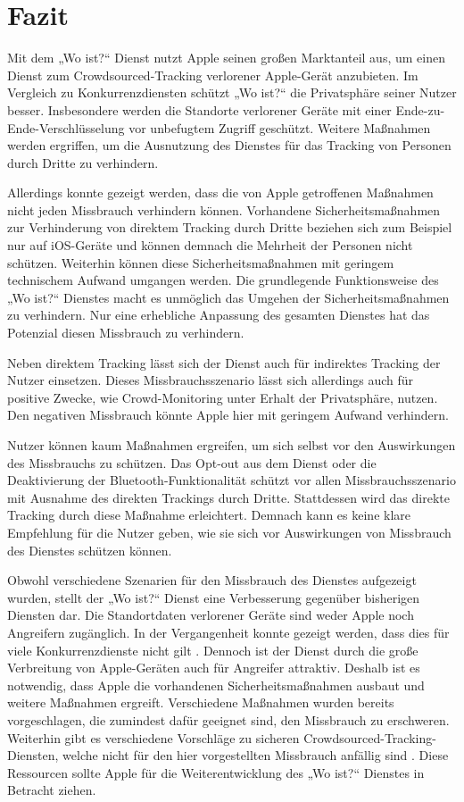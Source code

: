 \section{Fazit}
\label{sec:Fazit}

Mit dem „Wo ist?“ Dienst nutzt Apple seinen großen Marktanteil aus, um einen Dienst zum Crowdsourced-Tracking verlorener Apple-Gerät anzubieten.
Im Vergleich zu Konkurrenzdiensten schützt „Wo ist?“ die Privatsphäre seiner Nutzer besser.
Insbesondere werden die Standorte verlorener Geräte mit einer Ende-zu-Ende-Verschlüsselung vor unbefugtem Zugriff geschützt.
Weitere Maßnahmen werden ergriffen, um die Ausnutzung des Dienstes für das Tracking von Personen durch Dritte zu verhindern.

Allerdings konnte gezeigt werden, dass die von Apple getroffenen Maßnahmen nicht jeden Missbrauch verhindern können.
Vorhandene Sicherheitsmaßnahmen zur Verhinderung von direktem Tracking durch Dritte beziehen sich zum Beispiel nur auf iOS-Geräte und können demnach die Mehrheit der Personen nicht schützen.
Weiterhin können diese Sicherheitsmaßnahmen mit geringem technischem Aufwand umgangen werden.
Die grundlegende Funktionsweise des „Wo ist?“ Dienstes macht es unmöglich das Umgehen der Sicherheitsmaßnahmen zu verhindern.
Nur eine erhebliche Anpassung des gesamten Dienstes hat das Potenzial diesen Missbrauch zu verhindern.

Neben direktem Tracking lässt sich der Dienst auch für indirektes Tracking der Nutzer einsetzen.
Dieses Missbrauchsszenario lässt sich allerdings auch für positive Zwecke, wie Crowd-Monitoring unter Erhalt der Privatsphäre, nutzen.
Den negativen Missbrauch könnte Apple hier mit geringem Aufwand verhindern.

Nutzer können kaum Maßnahmen ergreifen, um sich selbst vor den Auswirkungen des Missbrauchs zu schützen.
Das Opt-out aus dem Dienst oder die Deaktivierung der Bluetooth-Funktionalität schützt vor allen Missbrauchsszenario mit Ausnahme des direkten Trackings durch Dritte.
Stattdessen wird das direkte Tracking durch diese Maßnahme erleichtert.
Demnach kann es keine klare Empfehlung für die Nutzer geben, wie sie sich vor Auswirkungen von Missbrauch des Dienstes schützen können.


Obwohl verschiedene Szenarien für den Missbrauch des Dienstes aufgezeigt wurden, stellt der „Wo ist?“ Dienst eine Verbesserung gegenüber bisherigen Diensten dar.
Die Standortdaten verlorener Geräte sind weder Apple noch Angreifern zugänglich.
In der Vergangenheit konnte gezeigt werden, dass dies für viele Konkurrenzdienste nicht gilt \cite{Garg_Secure_Tracker,Weller_BLE_Finders}.
Dennoch ist der Dienst durch die große Verbreitung von Apple-Geräten auch für Angreifer attraktiv.
Deshalb ist es notwendig, dass Apple die vorhandenen Sicherheitsmaßnahmen ausbaut und weitere Maßnahmen ergreift.
Verschiedene Maßnahmen wurden bereits vorgeschlagen, die zumindest dafür geeignet sind, den Missbrauch zu erschweren.
Weiterhin gibt es verschiedene Vorschläge zu sicheren Crowdsourced-Tracking-Diensten, welche nicht für den hier vorgestellten Missbrauch anfällig sind \cite{Garg_Secure_Tracker,Weller_BLE_Finders}.
Diese Ressourcen sollte Apple für die Weiterentwicklung des „Wo ist?“ Dienstes in Betracht ziehen.